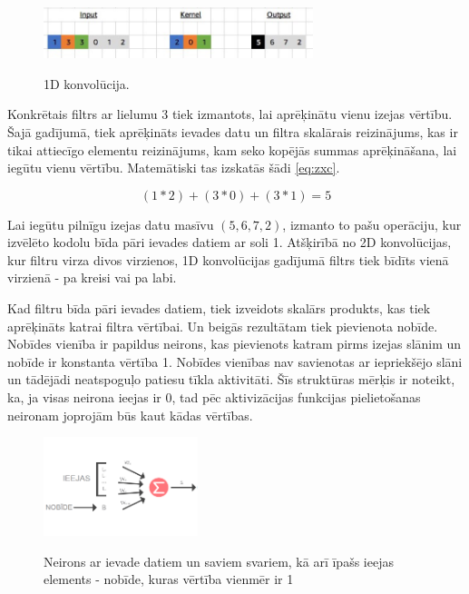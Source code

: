 \documentclass[12pt,paper=A4]{report}
\begin{document}

\begin{figure}[H] \centering
\includegraphics[width=0.70\textwidth]{1DConvCorrect2V} 
\caption{1D konvolūcija.}
\cite{cvbae}  \label{11DovExample} 
\end{figure}

Konkrētais filtrs ar lielumu 3 tiek izmantots, lai aprēķinātu vienu izejas vērtību. Šajā gadījumā, tiek aprēķināts ievades datu un filtra skalārais reizinājums, kas ir tikai attiecīgo elementu reizinājums, kam seko kopējās summas aprēķināšana, lai iegūtu vienu vērtību. Matemātiski tas izskatās šādi \ref{eq:zxc}. 

\begin{equation}
(1 * 2) + (3 * 0) + (3 * 1) = 5
\label{eq:zxc}
\end{equation}

Lai iegūtu pilnīgu izejas datu masīvu $(5,6,7,2)$, izmanto to pašu operāciju, kur izvēlēto kodolu bīda pāri ievades datiem ar soli 1. Atšķirībā no 2D konvolūcijas, kur filtru virza divos virzienos, 1D konvolūcijas gadījumā filtrs tiek bīdīts vienā virzienā - pa kreisi vai pa labi.

Kad filtru bīda pāri ievades datiem, tiek izveidots skalārs produkts, kas tiek aprēķināts katrai filtra vērtībai. Un beigās rezultātam tiek pievienota nobīde. Nobīdes vienība ir papildus neirons, kas pievienots katram pirms izejas slānim un nobīde ir konstanta vērtība 1. Nobīdes vienības nav savienotas ar iepriekšējo slāni un tādējādi neatspoguļo patiesu tīkla aktivitāti. Šīs struktūras mērķis ir noteikt, ka, ja visas neirona ieejas ir 0, tad pēc aktivizācijas funkcijas pielietošanas neironam joprojām būs kaut kādas vērtības.


\begin{figure}[H] \centering
\includegraphics[width=0.40\textwidth]{bias} 
\caption{Neirons ar ievade datiem un saviem svariem, kā arī īpašs ieejas elements - nobīde, kuras vērtība vienmēr ir 1}
\cite{NeuronBia}  \label{bias} 
\end{figure}
\end{document}
